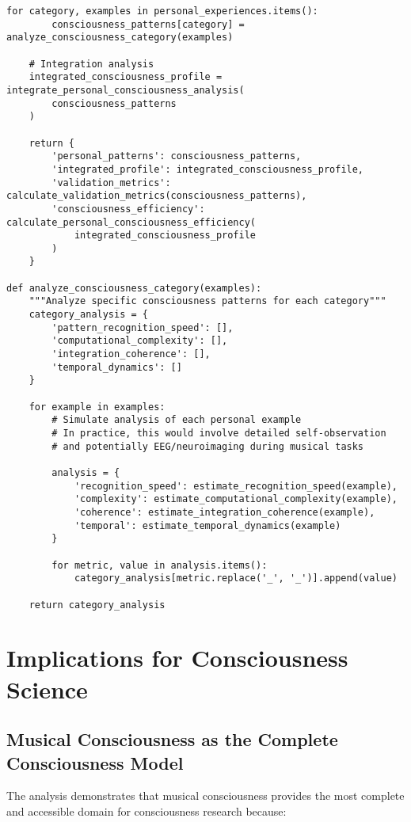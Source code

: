 \documentclass[12pt,a4paper]{article}
\begin{document}
\begin{lstlisting}[style=pythonstyle, caption=Personal Musical Consciousness Analysis]
    for category, examples in personal_experiences.items():
        consciousness_patterns[category] = analyze_consciousness_category(examples)
    
    # Integration analysis
    integrated_consciousness_profile = integrate_personal_consciousness_analysis(
        consciousness_patterns
    )
    
    return {
        'personal_patterns': consciousness_patterns,
        'integrated_profile': integrated_consciousness_profile,
        'validation_metrics': calculate_validation_metrics(consciousness_patterns),
        'consciousness_efficiency': calculate_personal_consciousness_efficiency(
            integrated_consciousness_profile
        )
    }

def analyze_consciousness_category(examples):
    """Analyze specific consciousness patterns for each category"""
    category_analysis = {
        'pattern_recognition_speed': [],
        'computational_complexity': [],
        'integration_coherence': [],
        'temporal_dynamics': []
    }
    
    for example in examples:
        # Simulate analysis of each personal example
        # In practice, this would involve detailed self-observation
        # and potentially EEG/neuroimaging during musical tasks
        
        analysis = {
            'recognition_speed': estimate_recognition_speed(example),
            'complexity': estimate_computational_complexity(example),
            'coherence': estimate_integration_coherence(example),
            'temporal': estimate_temporal_dynamics(example)
        }
        
        for metric, value in analysis.items():
            category_analysis[metric.replace('_', '_')].append(value)
    
    return category_analysis
\end{lstlisting}

\section{Implications for Consciousness Science}

\subsection{Musical Consciousness as the Complete Consciousness Model}

The analysis demonstrates that musical consciousness provides the most complete and accessible domain for consciousness research because:
\end{document}

